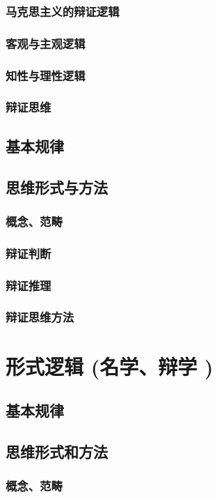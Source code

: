 \documentclass[UTF8]{../RepresentationUniverse}
\begin{document}
        \subsubsection{马克思主义的辩证逻辑}
        \subsubsection{客观与主观逻辑}
        \subsubsection{知性与理性逻辑}
        \subsubsection{辩证思维}
    \subsection{基本规律}
    \subsection{思维形式与方法}
        \subsubsection{概念、范畴}
        \subsubsection{辩证判断}
        \subsubsection{辩证推理}
        \subsubsection{辩证思维方法}

\section{形式逻辑 (名学、辩学 )}
    \subsection{基本规律}
    \subsection{思维形式和方法}
        \subsubsection{概念、范畴}
\end{document}
